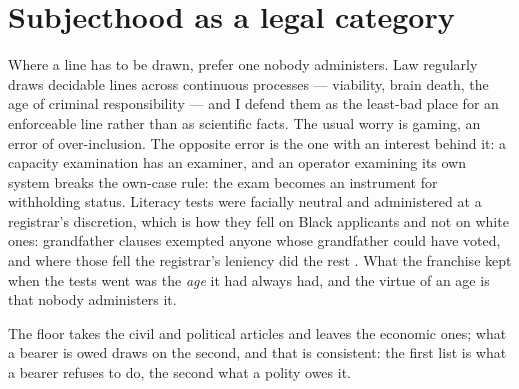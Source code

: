 \section{Subjecthood as a legal category}
\label{sec:33.1}
Where a line has to be drawn, prefer one nobody administers. Law regularly draws decidable lines across continuous processes — viability, brain death, the age of criminal responsibility — and I defend them as the least-bad place for an enforceable line rather than as scientific facts. The usual worry is gaming, an error of over-inclusion. The opposite error is the one with an interest behind it: a capacity examination has an examiner, and an operator examining its own system breaks the own-case rule: the exam becomes an instrument for withholding status. Literacy tests were facially neutral and administered at a registrar's discretion, which is how they fell on Black applicants and not on white ones: grandfather clauses exempted anyone whose grandfather could have voted, and where those fell the registrar's leniency did the rest \autocite{guinn1915,congress1965voting}. What the franchise kept when the tests went was the \emph{age} it had always had, and the virtue of an age is that nobody administers it.

The floor takes the civil and political articles and leaves the economic ones; what a bearer is owed draws on the second, and that is consistent: the first list is what a bearer refuses to do, the second what a polity owes it.
